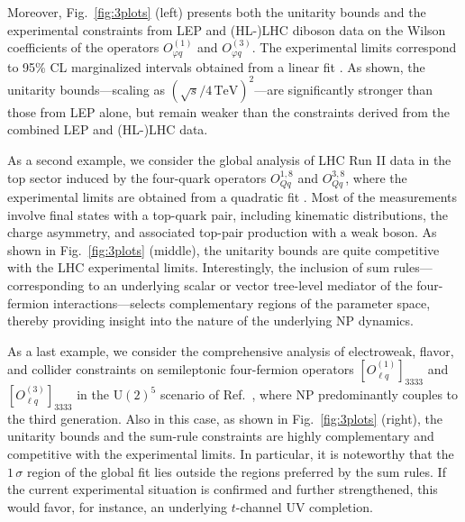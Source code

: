 \documentclass[
aps,
prd,
10pt,
twocolumn,
oneside,
preprintnumbers,
superscriptaddress,
amsmath,
amssymb,
nofootinbib,
flushbottom]{revtex4-2}
\begin{document}
%
Moreover, Fig.~\ref{fig:3plots} (left) presents both the unitarity bounds and the experimental constraints from LEP and (HL-)LHC diboson data on the Wilson coefficients of the operators $O_{\varphi q}^{(1)}$ and $O_{\varphi q}^{(3)}$.
%
The experimental limits correspond to 95\% CL marginalized intervals obtained from a linear fit \cite{Celada:2024mcf}. As shown, the unitarity bounds---scaling as $(\sqrt{s}/4\,\mathrm{TeV})^2$---are significantly stronger than those from LEP alone, but remain weaker than the constraints derived from the combined LEP and (HL-)LHC data.

As a second example, we consider the global analysis of LHC Run II data in the top sector induced by the four-quark operators $O_{Qq}^{1,8}$ and $O_{Qq}^{3,8}$, where the experimental limits are obtained from a quadratic fit \cite{Brivio:2019ius}.
%
Most of the measurements involve final states with a top-quark pair, including kinematic distributions, the charge asymmetry, and associated top-pair production with a weak boson. As shown in Fig.~\ref{fig:3plots} (middle), the unitarity bounds are quite competitive with the LHC experimental limits. Interestingly, the inclusion of sum rules---corresponding to an underlying scalar or vector tree-level mediator of the four-fermion interactions---selects complementary regions of the parameter space, thereby providing insight into the nature of the underlying NP dynamics.

As a last example, we consider the comprehensive analysis of electroweak, flavor, and collider constraints on semileptonic 
four-fermion operators $[O_{\ell q}^{(1)}]_{3333}$ and $[O_{\ell q}^{(3)}]_{3333}$ in the $\mathrm{U}(2)^5$ scenario of Ref.~\cite{Allwicher:2023shc}, where NP predominantly couples to the third generation. Also in this case, as shown in Fig.~\ref{fig:3plots} (right), the unitarity bounds and the sum-rule constraints are highly complementary and competitive with the experimental limits.
%
In particular, it is noteworthy that the $1\,\sigma$ region of the global fit lies outside the regions preferred by the sum rules. 
If the current experimental situation is confirmed and further strengthened, this would favor, for instance, an underlying $t$-channel UV completion.
\end{document}
